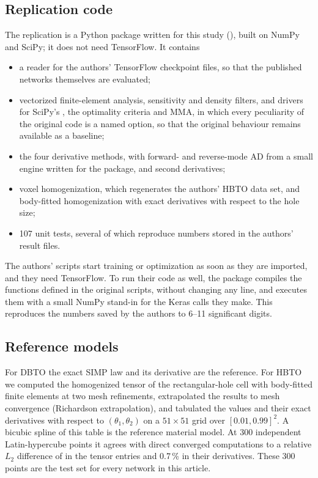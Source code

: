 \subsection{Replication code}
The replication is a Python package written for this study (), built
on NumPy and SciPy\supercite{Harris:2020,Virtanen:2020}; it does not need
TensorFlow. It contains
\begin{itemize}
\item a reader for the authors' TensorFlow checkpoint files, so that the
  published networks themselves are evaluated;
\item vectorized finite-element analysis, sensitivity and density
  filters\supercite{Andreassen:2011,Bourdin:2001,Bruns:2001}, and drivers for
  SciPy's , the optimality criteria and
  MMA\supercite{Svanberg:1987}, in which every peculiarity of the original code
  is a named option, so that the original behaviour remains available as a
  baseline;
\item the four derivative methods, with forward- and reverse-mode AD from a
  small engine written for the package, and second derivatives;
\item voxel homogenization, which regenerates the authors' HBTO data set, and
  body-fitted homogenization with exact derivatives with respect to the hole
  size\supercite{Andreassen:2014};
\item 107 unit tests, several of which reproduce numbers stored in the
  authors' result files.
\end{itemize}
The authors' scripts start training or optimization as soon as they are
imported, and they need TensorFlow. To run their code as well, the package
compiles the functions defined in the original scripts, without changing any
line, and executes them with a small NumPy stand-in for the Keras calls they
make. This reproduces the numbers saved by the authors to 6--11 significant
digits.

\subsection{Reference models}\label{sec:reference}
For DBTO the exact SIMP law and its derivative are the reference. For HBTO we
computed the homogenized tensor of the rectangular-hole cell with body-fitted
finite elements at two mesh refinements, extrapolated the results to mesh
convergence (Richardson extrapolation), and tabulated the values and their
exact derivatives with respect to $(\theta_1,\theta_2)$ on a $51\times51$ grid
over $[0.01,0.99]^2$. A bicubic spline of this table is the reference material
model. At 300 independent Latin-hypercube points it agrees with direct
converged computations to a relative $L_2$ difference of  in the
tensor entries and 0.7\,\% in their derivatives. These 300 points are the test
set for every network in this article.

